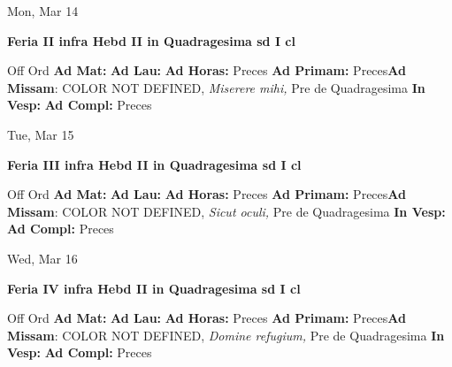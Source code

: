 \documentclass[10pt]{memoir}
\begin{document}
\begin{center}
\begin{minipage}{3.5in}
\vspace{2em}
\begin{center}Mon, Mar 14
\end{center}
\textbf{ \large Feria II infra Hebd II in Quadragesima
\textnormal{\normalsize sd I cl}}

\begin{justify}Off Ord
\textbf{Ad Mat: }
\textbf{Ad Lau: }
\textbf{Ad Horas: }Preces
\textbf{Ad Primam: }Preces\textbf{Ad Missam}: COLOR NOT DEFINED, \textit{Miserere mihi,} Pre de Quadragesima
\textbf{In Vesp: }
\textbf{Ad Compl: }Preces
\end{justify}
\end{minipage}
\end{center}

\begin{center}
\begin{minipage}{3.5in}
\vspace{2em}
\begin{center}Tue, Mar 15
\end{center}
\textbf{ \large Feria III infra Hebd II in Quadragesima
\textnormal{\normalsize sd I cl}}

\begin{justify}Off Ord
\textbf{Ad Mat: }
\textbf{Ad Lau: }
\textbf{Ad Horas: }Preces
\textbf{Ad Primam: }Preces\textbf{Ad Missam}: COLOR NOT DEFINED, \textit{Sicut oculi,} Pre de Quadragesima
\textbf{In Vesp: }
\textbf{Ad Compl: }Preces
\end{justify}
\end{minipage}
\end{center}

\begin{center}
\begin{minipage}{3.5in}
\vspace{2em}
\begin{center}Wed, Mar 16
\end{center}
\textbf{ \large Feria IV infra Hebd II in Quadragesima
\textnormal{\normalsize sd I cl}}

\begin{justify}Off Ord
\textbf{Ad Mat: }
\textbf{Ad Lau: }
\textbf{Ad Horas: }Preces
\textbf{Ad Primam: }Preces\textbf{Ad Missam}: COLOR NOT DEFINED, \textit{Domine refugium,} Pre de Quadragesima
\textbf{In Vesp: }
\textbf{Ad Compl: }Preces
\end{justify}
\end{minipage}
\end{center}
\end{document}
